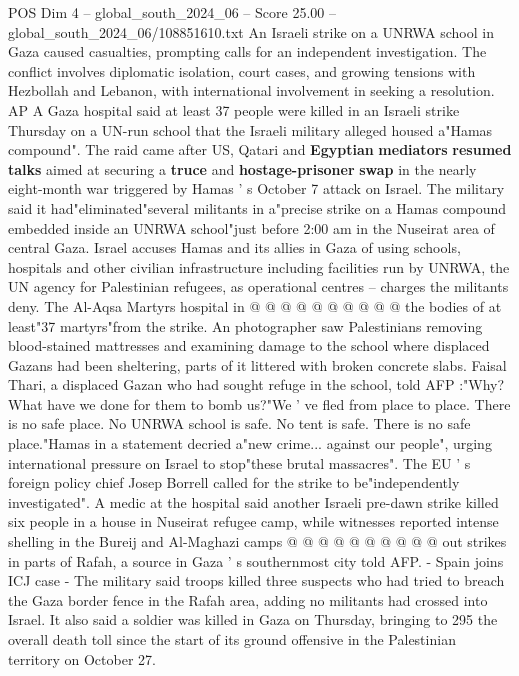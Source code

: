 \begin{textsample}{POS Dim 4 – global\_south\_2024\_06 – Score 25.00 – global\_south\_2024\_06/108851610.txt}  \label{ex:f4_pos_088}
An Israeli strike on a UNRWA school in Gaza caused casualties, prompting calls for an independent investigation.
The conflict involves diplomatic isolation, court cases, and growing tensions with Hezbollah and Lebanon, with international involvement in seeking a resolution.
AP A Gaza hospital said at least 37 people were killed in an Israeli strike Thursday on a UN-run school that the Israeli military alleged housed a"Hamas compound".
The raid came after US, Qatari and \textbf{Egyptian} \textbf{mediators} \textbf{resumed} \textbf{talks} aimed at securing a \textbf{truce} and \textbf{hostage-prisoner} \textbf{swap} in the nearly eight-month war triggered by Hamas ' s October 7 attack on Israel.
The military said it had"eliminated"several militants in a"precise strike on a Hamas compound embedded inside an UNRWA school"just before 2:00 am in the Nuseirat area of central Gaza.
Israel accuses Hamas and its allies in Gaza of using schools, hospitals and other civilian infrastructure including facilities run by UNRWA, the UN agency for Palestinian refugees, as operational centres -- charges the militants deny.
The Al-Aqsa Martyrs hospital in @ @ @ @ @ @ @ @ @ @ the bodies of at least"37 martyrs"from the strike.
An photographer saw Palestinians removing blood-stained mattresses and examining damage to the school where displaced Gazans had been sheltering, parts of it littered with broken concrete slabs.
Faisal Thari, a displaced Gazan who had sought refuge in the school, told AFP :"Why?
What have we done for them to bomb us?"We ' ve fled from place to place.
There is no safe place.
No UNRWA school is safe.
No tent is safe.
There is no safe place."Hamas in a statement decried a"new crime... against our people", urging international pressure on Israel to stop"these brutal massacres".
The EU ' s foreign policy chief Josep Borrell called for the strike to be"independently investigated".
A medic at the hospital said another Israeli pre-dawn strike killed six people in a house in Nuseirat refugee camp, while witnesses reported intense shelling in the Bureij and Al-Maghazi camps @ @ @ @ @ @ @ @ @ @ out strikes in parts of Rafah, a source in Gaza ' s southernmost city told AFP. - Spain joins ICJ case - The military said troops killed three suspects who had tried to breach the Gaza border fence in the Rafah area, adding no militants had crossed into Israel.
It also said a soldier was killed in Gaza on Thursday, bringing to 295 the overall death toll since the start of its ground offensive in the Palestinian territory on October 27.

\end{textsample}
